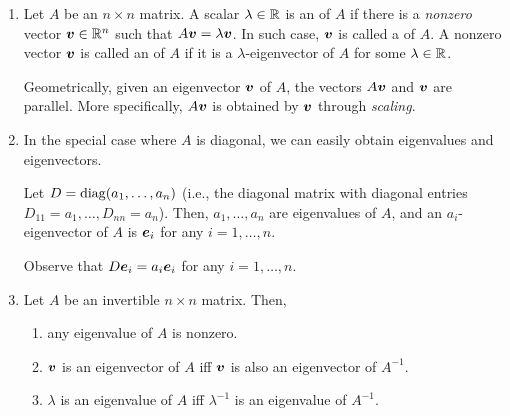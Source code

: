 \begin{enumerate}
\item Let \(A\) be an \(n\times n\) matrix. A scalar \(\lambda\in\mathbb{R}\) is an
 of \(A\) if there is a \emph{nonzero} vector
\(\vb*{v}\in\mathbb{R}^n\) such that \(A\vb*{v}=\lambda\vb*{v}\). In such case,
\(\vb*{v}\) is called a  of \(A\). A nonzero
vector \(\vb*{v}\) is called an  of \(A\) if it is a
\(\lambda\)-eigenvector of \(A\) for some \(\lambda\in\mathbb{R}\).


Geometrically, given an eigenvector \(\vb*{v}\) of \(A\), the vectors
\(A\vb*{v}\) and \(\vb*{v}\) are parallel. More specifically, \(A\vb*{v}\)
is obtained by \(\vb*{v}\) through \emph{scaling}.

\item In the special case where \(A\) is diagonal, we can easily obtain
eigenvalues and eigenvectors.

\begin{proposition}
\label{prp:eigen-diagonal}
Let \(D=\operatorname{diag}(a_1,\dotsc,a_n)\) (i.e., the diagonal matrix with diagonal
entries \(D_{11}=a_1,\dotsc,D_{nn}=a_n\)). Then, \(a_1,\dotsc,a_n\) are
eigenvalues of \(A\), and an \(a_i\)-eigenvector of \(A\) is \(\vb*{e}_i\) for
any \(i=1,\dotsc,n\).
\end{proposition}
\begin{pf}
Observe that \(D\vb*{e}_i=a_i\vb*{e}_i\) for any \(i=1,\dotsc,n\).
\end{pf}

\item \label{it:inv-eigen} Let \(A\) be an invertible \(n\times n\) matrix.
Then,
\begin{enumerate}
\item any eigenvalue of \(A\) is nonzero.
\item \(\vb*{v}\) is an eigenvector of \(A\) iff \(\vb*{v}\) is also an
eigenvector of \(A^{-1}\).
\item \(\lambda\) is an eigenvalue of \(A\) iff \(\lambda^{-1}\) is an
eigenvalue of \(A^{-1}\).
\end{enumerate}


\end{enumerate}
